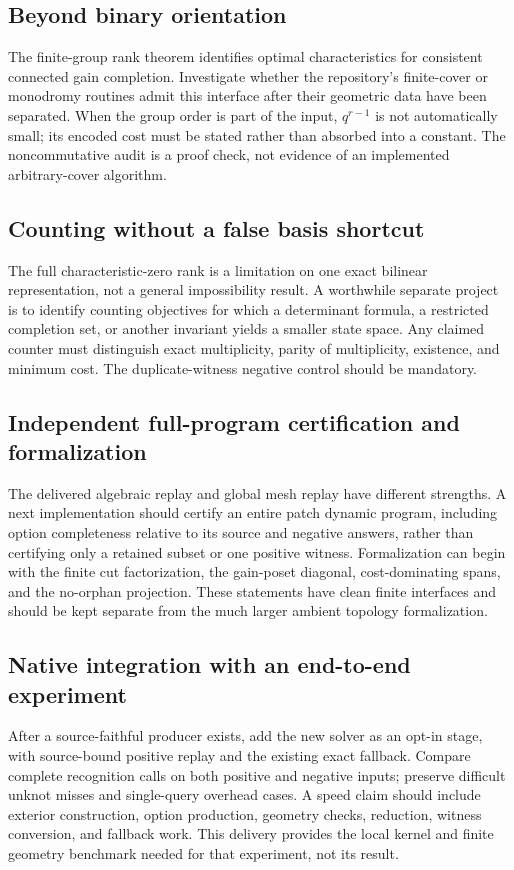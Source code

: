 \documentclass[11pt,letterpaper]{article}
\theoremstyle{definition}
\begin{document}
\subsection{Beyond binary orientation}
The finite-group rank theorem identifies optimal characteristics for consistent connected gain completion. Investigate whether the repository's finite-cover or monodromy routines admit this interface after their geometric data have been separated. When the group order is part of the input, $q^{r-1}$ is not automatically small; its encoded cost must be stated rather than absorbed into a constant. The noncommutative audit is a proof check, not evidence of an implemented arbitrary-cover algorithm.

\subsection{Counting without a false basis shortcut}
The full characteristic-zero rank is a limitation on one exact bilinear representation, not a general impossibility result. A worthwhile separate project is to identify counting objectives for which a determinant formula, a restricted completion set, or another invariant yields a smaller state space. Any claimed counter must distinguish exact multiplicity, parity of multiplicity, existence, and minimum cost. The duplicate-witness negative control should be mandatory.

\subsection{Independent full-program certification and formalization}
The delivered algebraic replay and global mesh replay have different strengths. A next implementation should certify an entire patch dynamic program, including option completeness relative to its source and negative answers, rather than certifying only a retained subset or one positive witness. Formalization can begin with the finite cut factorization, the gain-poset diagonal, cost-dominating spans, and the no-orphan projection. These statements have clean finite interfaces and should be kept separate from the much larger ambient topology formalization.

\subsection{Native integration with an end-to-end experiment}
After a source-faithful producer exists, add the new solver as an opt-in stage, with source-bound positive replay and the existing exact fallback. Compare complete recognition calls on both positive and negative inputs; preserve difficult unknot misses and single-query overhead cases. A speed claim should include exterior construction, option production, geometry checks, reduction, witness conversion, and fallback work. This delivery provides the local kernel and finite geometry benchmark needed for that experiment, not its result.
\end{document}
